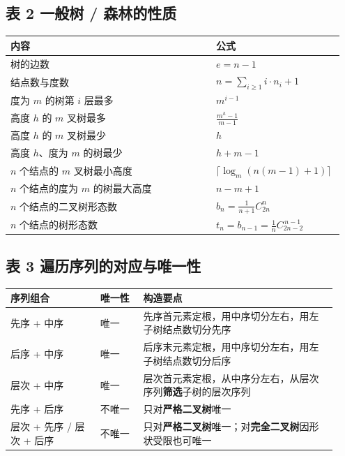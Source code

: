 \documentclass[11pt,openany,UTF8]{ctexbook}
\begin{document}
\subsection{表 2 一般树 / 森林的性质}

\begingroup\small\setlength{\tabcolsep}{4.0pt}
\begin{longtable}{@{}L{0.6082\linewidth}L{0.3374\linewidth}@{}}
\toprule
\textbf{内容} & \textbf{公式} \\
\midrule
\endhead
树的边数 & $e=n-1$ \\
结点数与度数 & $n=\sum\limits_{i\ge1}i\cdot n_i+1$ \\
度为 $m$ 的树第 $i$ 层最多 & $m^{i-1}$ \\
高度 $h$ 的 $m$ 叉树最多 & $\frac{m^h-1}{m-1}$ \\
高度 $h$ 的 $m$ 叉树最少 & $h$ \\
高度 $h$、度为 $m$ 的树最少 & $h+m-1$ \\
$n$ 个结点的 $m$ 叉树最小高度 & $\lceil\log_m(n(m-1)+1)\rceil$ \\
$n$ 个结点的度为 $m$ 的树最大高度 & $n-m+1$ \\
$n$ 个结点的二叉树形态数 & $b_n=\frac{1}{n+1}C_{2n}^{n}$ \\
$n$ 个结点的树形态数 & $t_n=b_{n-1}=\frac{1}{n}C_{2n-2}^{\,n-1}$ \\
\bottomrule
\end{longtable}
\endgroup

\subsection{表 3 遍历序列的对应与唯一性}

\begingroup\small\setlength{\tabcolsep}{4.0pt}
\begin{longtable}{@{}L{0.2564\linewidth}L{0.1256\linewidth}L{0.5466\linewidth}@{}}
\toprule
\textbf{序列组合} & \textbf{唯一性} & \textbf{构造要点} \\
\midrule
\endhead
先序 + 中序 & 唯一 & 先序首元素定根，用中序切分左右，用左子树结点数切分先序 \\
后序 + 中序 & 唯一 & 后序末元素定根，用中序切分左右，用左子树结点数切分后序 \\
层次 + 中序 & 唯一 & 层次首元素定根，从中序分左右，从层次序列\textbf{筛选}子树的层次序列 \\
先序 + 后序 & 不唯一 & 只对\textbf{严格二叉树}唯一 \\
层次 + 先序 / 层次 + 后序 & 不唯一 & 只对\textbf{严格二叉树}唯一；对\textbf{完全二叉树}因形状受限也可唯一 \\
\bottomrule
\end{longtable}
\endgroup
\end{document}
